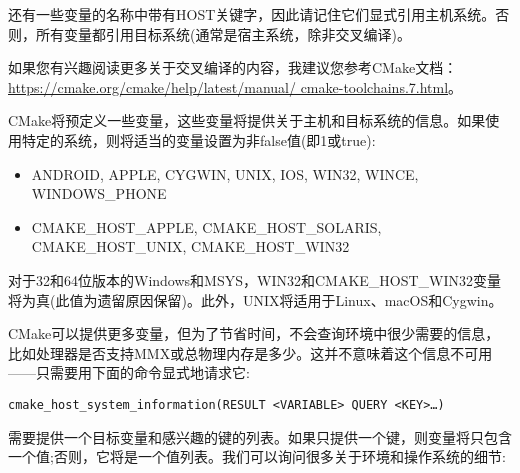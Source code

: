 还有一些变量的名称中带有HOST关键字，因此请记住它们显式引用主机系统。否则，所有变量都引用目标系统(通常是宿主系统，除非交叉编译)。

如果您有兴趣阅读更多关于交叉编译的内容，我建议您参考CMake文档：\url{https://cmake.org/cmake/help/latest/manual/ cmake-toolchains.7.html}。


CMake将预定义一些变量，这些变量将提供关于主机和目标系统的信息。如果使用特定的系统，则将适当的变量设置为非false值(即1或true):

\begin{itemize}
\item 
ANDROID, APPLE, CYGWIN, UNIX, IOS, WIN32, WINCE, WINDOWS\_PHONE

\item 
CMAKE\_HOST\_APPLE, CMAKE\_HOST\_SOLARIS, CMAKE\_HOST\_UNIX, CMAKE\_HOST\_WIN32
\end{itemize}

对于32和64位版本的Windows和MSYS，WIN32和CMAKE\_HOST\_WIN32变量将为真(此值为遗留原因保留)。此外，UNIX将适用于Linux、macOS和Cygwin。


CMake可以提供更多变量，但为了节省时间，不会查询环境中很少需要的信息，比如处理器是否支持MMX或总物理内存是多少。这并不意味着这个信息不可用——只需要用下面的命令显式地请求它:

\begin{lstlisting}[style=styleCMake]
cmake_host_system_information(RESULT <VARIABLE> QUERY <KEY>…)
\end{lstlisting}

需要提供一个目标变量和感兴趣的键的列表。如果只提供一个键，则变量将只包含一个值;否则，它将是一个值列表。我们可以询问很多关于环境和操作系统的细节:

